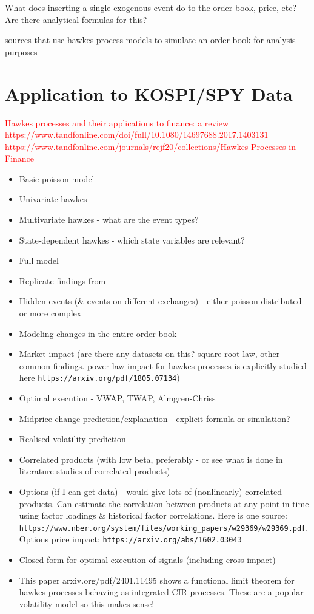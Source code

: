 \documentclass[honours,12pt]{unswthesis}
\numberwithin{equation}{section}
\begin{document}
What does inserting a single exogenous event do to the order book, price, etc? Are there analytical formulas for this?


\cite{AbergelJedidi} \cite{Toke} sources that use hawkes process models to simulate an order book for analysis purposes


\chapter{Application to KOSPI/SPY Data} %
\textcolor{red}{Hawkes processes and their applications to finance: a review https://www.tandfonline.com/doi/full/10.1080/14697688.2017.1403131}
\textcolor{red}{https://www.tandfonline.com/journals/rejf20/collections/Hawkes-Processes-in-Finance}


\begin{itemize}
	\item Basic poisson model
	\item Univariate hawkes
	\item Multivariate hawkes - what are the event types?
	\item State-dependent hawkes - which state variables are relevant?
	\item Full model
	\item Replicate findings from \cite{MorariuPatrichiPakkanen}
	\item Hidden events (\& events on different exchanges) - either poisson distributed or more complex
	\item Modeling changes in the entire order book
	\item Market impact (are there any datasets on this? square-root law, other common findings. power law impact for hawkes processes is explicitly studied here \texttt{https://arxiv.org/pdf/1805.07134})
	\item Optimal execution - VWAP, TWAP, Almgren-Chriss
	\item Midprice change prediction/explanation - explicit formula or simulation?
	\item Realised volatility prediction
	\item Correlated products (with low beta, preferably - or see what is done in literature studies of correlated products)
	\item Options (if I can get data) - would give lots of (nonlinearly) correlated products. Can estimate the correlation between products at any point in time using factor loadings \& historical factor correlations. Here is one source: \texttt{https://www.nber.org/system/files/working_papers/w29369/w29369.pdf}. Options price impact: \texttt{https://arxiv.org/abs/1602.03043}
	\item Closed form for optimal execution of signals (including cross-impact)
	\item This paper arxiv.org/pdf/2401.11495 shows a functional limit theorem for hawkes processes behaving as integrated CIR processes. These are a popular volatility model so this makes sense!
\end{itemize}
\end{document}
